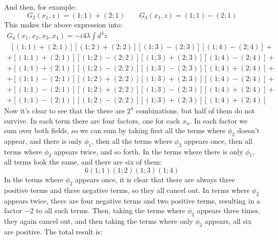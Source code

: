 \documentclass{article}
\begin{document}
And then, for example:
\begin{equation}
    G_2(x_1, z) = (1;1) + (2;1)
    \qquad
    G_3(x_1, z) = (1;1) - (2;1)
\end{equation}
This makes the above expression into:
\begin{equation}
\begin{gathered}
    G_4(x_1, x_2, x_3, x_4) = -i 4 \lambda \int d^4z \\
    \ \ [(1;1) + (2;1)] [(1;2) + (2;2)] [(1;3) - (2;3)] [(1;4) - (2;4)] + \\ +
    [(1;1) + (2;1)] [(1;2) - (2;2)] [(1;3) + (2;3)] [(1;4) - (2;4)] + \\ +
    [(1;1) + (2;1)] [(1;2) - (2;2)] [(1;3) - (2;3)] [(1;4) + (2;4)] + \\ +
    [(1;1) - (2;1)] [(1;2) + (2;2)] [(1;3) + (2;3)] [(1;4) - (2;4)] + \\ +
    [(1;1) - (2;1)] [(1;2) + (2;2)] [(1;3) - (2;3)] [(1;4) + (2;4)] + \\ +
    [(1;1) - (2;1)] [(1;2) - (2;2)] [(1;3) + (2;3)] [(1;4) + (2;4)] \ \
\end{gathered}
\end{equation}
Now it's clear to see that the there are $2^4$ combinations, but half of them do not survive. In each term there are four factors, one for each $x_n$. In each factor we sum over both fields, so we can sum by taking first all the terms where $\phi_2$ doesn't appear, and there is only $\phi_1$, then all the terms where $\phi_2$ appears once, then all terms where $\phi_2$ appears twice, and so forth. In the terms where there is only $\phi_1$, all terms look the same, and there are six of them:
\begin{equation}
    6(1;1)(1;2)(1;3)(1;4)
\end{equation}
In the terms where $\phi_2$ appears once, it is clear that there are always three positive terms and three negative terms, so they all cancel out. In terms where $\phi_2$ appears twice, there are four negative terms and two positive terms, resulting in a factor $-2$ to all such terms. Then, taking the terms where $\phi_2$ appears three times, they again cancel out, and then taking the terms where only $\phi_2$ appears, all six are positive. The total result is:
\end{document}
